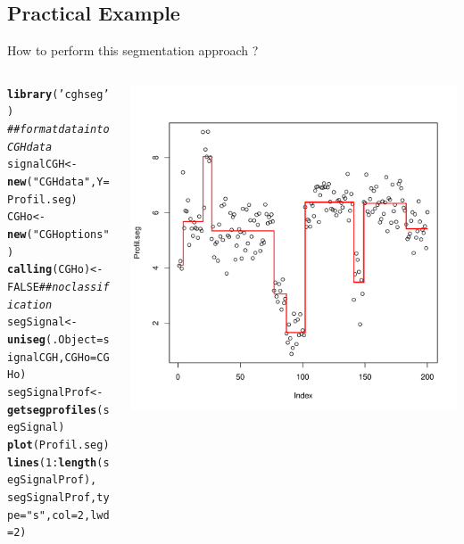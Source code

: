 \documentclass{beamer}\usepackage[]{graphicx}\usepackage[]{color}
\makeatletter
\newcommand{\hlnum}[1]{\textcolor[rgb]{0.686,0.059,0.569}{#1}}%
\newcommand{\hlstr}[1]{\textcolor[rgb]{0.192,0.494,0.8}{#1}}%
\newcommand{\hlcom}[1]{\textcolor[rgb]{0.678,0.584,0.686}{\textit{#1}}}%
\newcommand{\hlopt}[1]{\textcolor[rgb]{0,0,0}{#1}}%
\newcommand{\hlstd}[1]{\textcolor[rgb]{0.345,0.345,0.345}{#1}}%
\newcommand{\hlkwb}[1]{\textcolor[rgb]{0.69,0.353,0.396}{#1}}%
\newcommand{\hlkwc}[1]{\textcolor[rgb]{0.333,0.667,0.333}{#1}}%
\newcommand{\hlkwd}[1]{\textcolor[rgb]{0.737,0.353,0.396}{\textbf{#1}}}%
\newenvironment{kframe}{%
 \def\at@end@of@kframe{}%
 \ifinner\ifhmode%
  \def\at@end@of@kframe{\end{minipage}}%
  \begin{minipage}{\columnwidth}%
 \fi\fi%
 \def\FrameCommand##1{\hskip\@totalleftmargin \hskip-\fboxsep
 \colorbox{shadecolor}{##1}\hskip-\fboxsep
     \hskip-\linewidth \hskip-\@totalleftmargin \hskip\columnwidth}%
 \MakeFramed {\advance\hsize-\width
   \@totalleftmargin\z@ \linewidth\hsize
   \@setminipage}}%
 {\par\unskip\endMakeFramed%
 \at@end@of@kframe}
\newenvironment{knitrout}{}{} %
\makeatother
\begin{document}
\subsection*{Practical Example}
   \begin{frame}[fragile]{How to perform this segmentation approach ?}
\begin{columns}
\begin{column}{0.4\textwidth}
\begin{knitrout}\tiny
{}\color{fgcolor}\begin{kframe}
\begin{alltt}
\hlkwd{library}\hlstd{(}\hlstr{'cghseg'}\hlstd{)}
\hlcom{## format data into CGHdata}
\hlstd{signalCGH}    \hlkwb{<-} \hlkwd{new}\hlstd{(}\hlstr{"CGHdata"}\hlstd{,}\hlkwc{Y}\hlstd{=Profil.seg)}
\hlstd{CGHo}         \hlkwb{<-} \hlkwd{new}\hlstd{(}\hlstr{"CGHoptions"}\hlstd{)}
\hlkwd{calling}\hlstd{(CGHo)}\hlkwb{<-} \hlnum{FALSE} \hlcom{## no classification }
\hlstd{segSignal}   \hlkwb{<-} \hlkwd{uniseg}\hlstd{(}\hlkwc{.Object}\hlstd{=signalCGH,}\hlkwc{CGHo}\hlstd{=CGHo)}
\hlstd{segSignalProf} \hlkwb{<-} \hlkwd{getsegprofiles}\hlstd{(segSignal)}
\hlkwd{plot}\hlstd{(Profil.seg)}
\hlkwd{lines}\hlstd{(}\hlnum{1}\hlopt{:}\hlkwd{length}\hlstd{(segSignalProf),}
      \hlstd{segSignalProf,} \hlkwc{type}\hlstd{=}\hlstr{"s"}\hlstd{,} \hlkwc{col}\hlstd{=}\hlnum{2}\hlstd{,} \hlkwc{lwd}\hlstd{=}\hlnum{2}\hlstd{)}
\end{alltt}
\end{kframe}
\end{knitrout}
\end{column}
\begin{column}{0.5\textwidth}
\includegraphics[scale=0.35]{segCode3-1.pdf}
\end{column}
\end{columns}
\end{frame}
% 
\end{document}
